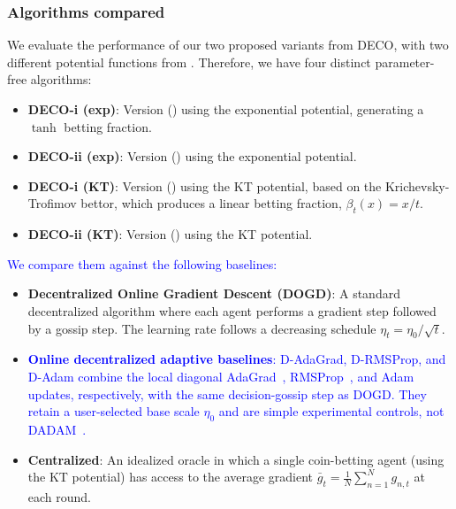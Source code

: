 \documentclass[journal]{IEEEtran}
\newcommand{\algname}{{DECO}\xspace}
\begin{document}
\subsubsection*{Algorithms compared}
We evaluate the performance of our two proposed variants from \algname{}, with two different potential functions from .
Therefore, we have four distinct parameter-free algorithms:
\begin{itemize}
    \item \textbf{\algname{}-i (exp)}: Version () using the exponential potential, generating a $\tanh$ betting fraction.
    \item \textbf{\algname{}-ii (exp)}: Version () using the exponential potential.
    \item \textbf{\algname{}-i (KT)}: Version () using the KT potential, based on the Krichevsky-Trofimov bettor, which produces a linear betting fraction, $\beta_t(x) = x/t$.
    \item \textbf{\algname{}-ii (KT)}: Version () using the KT potential.
\end{itemize}
\textcolor{blue}{We compare them against the following baselines:}
\begin{itemize}
    \item \textbf{Decentralized Online Gradient Descent (DOGD)}: A standard decentralized algorithm where each agent performs a gradient step followed by a gossip step.
          The learning rate follows a decreasing schedule $\eta_t = \eta_0 / \sqrt{t}$.
    \item \textcolor{blue}{\textbf{Online decentralized adaptive baselines}: D-AdaGrad, D-RMSProp, and D-Adam combine the local diagonal AdaGrad~\cite{duchi_adaptive_2011}, RMSProp~\cite{tieleman_lecture_2012}, and Adam~\cite{kingma_adam_2015} updates, respectively, with the same decision-gossip step as DOGD\@. They retain a user-selected base scale $\eta_0$ and are simple experimental controls, not DADAM~\cite{nazari_dadam_2019}.}
    \item \textbf{Centralized}: An idealized oracle in which a single coin-betting agent (using the KT potential) has access to the average gradient $\bar{g}_t = \frac{1}{N}\sum_{n=1}^N g_{n,t}$ at each round.
\end{itemize}
\end{document}
